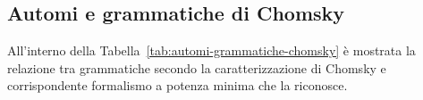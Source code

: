 \documentclass[italian, 10pt]{article}
\begin{document}
\begin{table}[htbp]
  \bigskip
  \centering
  \bigskip
  \caption{Chiusura degli automi rispetto alle operazioni}
  \label{tab:chisura-automi-rispetto-operazioni}
\end{table}

\subsection{Automi e grammatiche di Chomsky}

All'interno della Tabella~\ref{tab:automi-grammatiche-chomsky} è mostrata la relazione tra grammatiche secondo la caratterizzazione di Chomsky e corrispondente formalismo a potenza minima che la riconosce.
\end{document}

